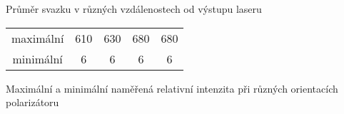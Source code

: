 \begin{graph}[htbp] 
\centering

\caption{Průměr svazku v různých vzdálenostech od výstupu laseru}
\label{g:div}
\end{graph}


\begin{tabulka}[htbp]
\centering
\begin{tabular}{c|cccc}
maximální & 610 &  630 & 680 & 680 \\
minimální & 6 & 6 & 6 & 6 \\
\end{tabular}
\caption{Maximální a minimální naměřená relativní intenzita při různých orientacích polarizátoru}
\label{t:pol}
\end{tabulka}